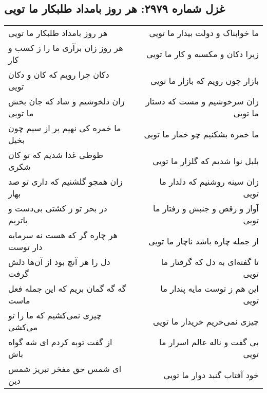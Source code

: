 \begin{center}
\section*{غزل شماره ۲۹۷۹: هر روز بامداد طلبکار ما تویی}
\label{sec:2979}
\begin{longtable}{l p{0.5cm} r}
هر روز بامداد طلبکار ما تویی
&&
ما خوابناک و دولت بیدار ما تویی
\\
هر روز زان برآری ما را ز کسب و کار
&&
زیرا دکان و مکسبه و کار ما تویی
\\
دکان چرا رویم که کان و دکان تویی
&&
بازار چون رویم که بازار ما تویی
\\
زان دلخوشیم و شاد که جان بخش ما تویی
&&
زان سرخوشیم و مست که دستار ما تویی
\\
ما خمره کی نهیم پر از سیم چون بخیل
&&
ما خمره بشکنیم چو خمار ما تویی
\\
طوطی غذا شدیم که تو کان شکری
&&
بلبل نوا شدیم که گلزار ما تویی
\\
زان همچو گلشنیم که داری تو صد بهار
&&
زان سینه روشنیم که دلدار ما تویی
\\
در بحر تو ز کشتی بی‌دست و پاتریم
&&
آواز و رقص و جنبش و رفتار ما تویی
\\
هر چاره گر که هست نه سرمایه دار توست
&&
از جمله چاره باشد ناچار ما تویی
\\
دل را هر آنچ بود از آن‌ها دلش گرفت
&&
تا گفته‌ای به دل که گرفتار ما تویی
\\
گه گه گمان بریم که این جمله فعل ماست
&&
این هم ز توست مایه پندار ما تویی
\\
چیزی نمی‌کشیم که ما را تو می‌کشی
&&
چیزی نمی‌خریم خریدار ما تویی
\\
از گفت توبه کردم ای شه گواه باش
&&
بی گفت و ناله عالم اسرار ما تویی
\\
ای شمس حق مفخر تبریز شمس دین
&&
خود آفتاب گنبد دوار ما تویی
\\
\end{longtable}
\end{center}
